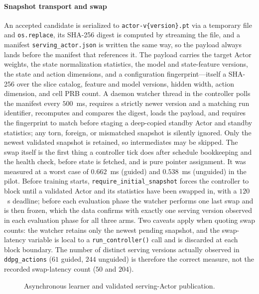 \paragraph*{Snapshot transport and swap}
An accepted candidate is serialized to \texttt{actor-v\{version\}.pt} via a temporary file and \texttt{os.replace}, its SHA-256 digest is computed by streaming the file, and a manifest \texttt{serving\_actor.json} is written the same way, so the payload always lands before the manifest that references it. The payload carries the target Actor weights, the state normalization statistics, the model and state-feature versions, the state and action dimensions, and a configuration fingerprint---itself a SHA-256 over the slice catalog, feature and model versions, hidden width, action dimension, and cell PRB count. A daemon watcher thread in the controller polls the manifest every $500$~ms, requires a strictly newer version and a matching run identifier, recomputes and compares the digest, loads the payload, and requires the fingerprint to match before staging a deep-copied standby Actor and standby statistics; any torn, foreign, or mismatched snapshot is silently ignored. Only the newest validated snapshot is retained, so intermediates may be skipped. The swap itself is the first thing a controller tick does after schedule bookkeeping and the health check, before state is fetched, and is pure pointer assignment. It was measured at a worst case of $0.662$~ms (guided) and $0.538$~ms (unguided) in the pilot. Before training starts, \texttt{require\_initial\_snapshot} forces the controller to block until a validated Actor and its statistics have been swapped in, with a $120$~s deadline; before each evaluation phase the watcher performs one last swap and is then frozen, which the data confirms with exactly one serving version observed in each evaluation phase for all three arms. Two caveats apply when quoting swap counts: the watcher retains only the newest pending snapshot, and the swap-latency variable is local to a \texttt{run\_controller()} call and is discarded at each block boundary. The number of distinct serving versions actually observed in \texttt{ddpg\_actions} ($61$ guided, $244$ unguided) is therefore the correct measure, not the recorded swap-latency count ($50$ and $204$).

\begin{figure}[t]
  \centering
  
  \caption{Asynchronous learner and validated serving-Actor publication.}
  \label{fig:async}
\end{figure}

